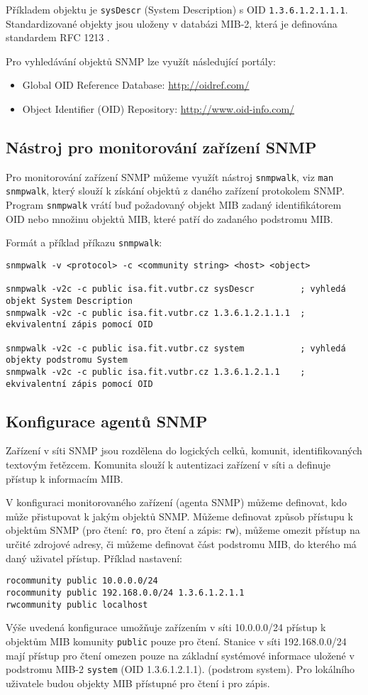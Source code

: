 Příkladem objektu je {\tt sysDescr} (System Description) s OID {\tt 1.3.6.1.2.1.1.1}. Standardizované objekty jsou uloženy v databázi MIB-2, která je definována standardem RFC 1213 \cite{rfc1213}.

Pro vyhledávání objektů SNMP lze využít následující portály:
\begin{itemize}
  \item Global OID Reference Database: \url{http://oidref.com/}
  \item Object Identifier (OID) Repository: \url{http://www.oid-info.com/}
\end{itemize}

\subsection{Nástroj pro monitorování zařízení SNMP}
Pro monitorování zařízení SNMP můžeme využít nástroj {\tt snmpwalk}, viz {\tt man snmpwalk}, který slouží k získání objektů z daného zařízení protokolem SNMP. Program {\tt snmpwalk} vrátí buď požadovaný objekt MIB zadaný identifikátorem OID nebo množinu objektů MIB, které patří do zadaného podstromu MIB.

Formát a příklad příkazu {\tt snmpwalk}:
{\small
\begin{verbatim}
snmpwalk -v <protocol> -c <community string> <host> <object>

snmpwalk -v2c -c public isa.fit.vutbr.cz sysDescr         ; vyhledá objekt System Description
snmpwalk -v2c -c public isa.fit.vutbr.cz 1.3.6.1.2.1.1.1  ; ekvivalentní zápis pomocí OID

snmpwalk -v2c -c public isa.fit.vutbr.cz system           ; vyhledá objekty podstromu System
snmpwalk -v2c -c public isa.fit.vutbr.cz 1.3.6.1.2.1.1    ; ekvivalentní zápis pomocí OID
\end{verbatim}
}

\subsection{Konfigurace agentů SNMP}
Zařízení v síti SNMP jsou rozdělena do logických celků, komunit, identifikovaných textovým  řetězcem. Komunita slouží k autentizaci zařízení v síti a definuje přístup k informacím MIB.

V konfiguraci monitorovaného zařízení (agenta SNMP) můžeme definovat, kdo může přistupovat k jakým objektů SNMP. Můžeme definovat způsob přístupu k objektům SNMP (pro čtení: {\tt ro},  pro čtení a zápis: {\tt rw}), můžeme omezit přístup na určité zdrojové adresy, či můžeme definovat část podstromu MIB, do kterého má daný uživatel přístup.  
Příklad nastavení: 
\begin{verbatim}
rocommunity public 10.0.0.0/24
rocommunity public 192.168.0.0/24 1.3.6.1.2.1.1
rwcommunity public localhost
\end{verbatim}
Výše uvedená konfigurace umožňuje zařízením v síti 10.0.0.0/24 přístup k objektům MIB komunity {\tt public} pouze
 pro čtení. Stanice v síti 192.168.0.0/24 mají přístup pro čtení omezen pouze na základní systémové informace uložené v podstromu MIB-2 {\tt system} (OID 1.3.6.1.2.1.1). 
 (podstrom system). Pro lokálního uživatele budou objekty MIB přístupné pro čtení i pro zápis.

